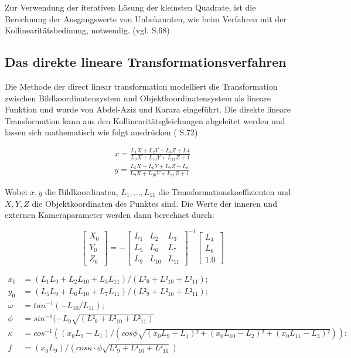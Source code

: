Zur Verwendung der iterativen Lösung der kleinsten Quadrate, ist die Berechnung der Ausgangswerte von Unbekannten, wie beim Verfahren mit der Kollinearitätsbedinung, notwendig. (vgl. \cite{comparative_conditions_study} S.68)


\subsection{Das direkte lineare Transformationsverfahren}

Die Methode der \glqq direct linear transformation\grqq{}  modelliert die Transformation zwischen Bildkoordinatensystem und Objektkoordinatensystem als lineare Funktion und wurde von Abdel-Aziz und Karara \cite{dlt_intro} eingeführt. Die direkte lineare Transformation kann aus den Kollinearitätsgleichungen abgeleitet werden und lassen sich mathematisch wie folgt ausdrücken (\cite{dlt} S.72)

\begin{equation}
\begin{aligned}
x=\frac{L_1X+L_2Y+L_3Z+L4}{L_9X+L_{10}Y+L_{11}Z+1} \\
y=\frac{L_5X+L_6Y+L_7Z+L_8}{L_9X+L_{10}Y+L_{11}Z+1}
\end{aligned}
\end{equation}

Wobei $x,y$ die Bildkoordinaten, $L_1,...,L_{11}$ die Transformationskoeffizienten und $X,Y,Z$ die Objektkoordinaten des Punktes sind. Die Werte der inneren und externen Kameraparameter werden dann berechnet durch:

\begin{equation}
\begin{bmatrix}
X_0 \\ Y_0 \\ Z_0 
\end{bmatrix}
 = -
 \begin{bmatrix}
 L_1 & L_2 & L_3 \\
 L_5 & L_6 & L_7 \\
 L_9 & L_{10} & L_{11}
 \end{bmatrix}^{-1}
 \begin{bmatrix}
 L_4 \\ L_8 \\ 1.0
 \end{bmatrix}
 \end{equation}
 
 \begin{equation}
 \begin{aligned}
 x_0 &= (L_1L_9 + L_2L_{10} + L_3L_{11})/(L²_9 + L²_{10} + L²_{11}); \\
 y_0 &= (L_5L_9 + L_6L_{10} + L_7L_{11})/(L²_9 + L²_{10} + L²_{11}); \\
 \omega &= tan^{-1}(-L_{10}/L_{11}); \\
 \phi &= sin^{-1}(-L_9 \sqrt{(L²_9 + L²_{10} + L²_{11})} \\
  \kappa &= cos^{-1}((x_0L_9 - L_1)/(cos \phi \sqrt{(x_0L_9-L_1)² + (x_0L_{10}-L_2)² + (x_0L_{11}-L_3)²})); \\
 f&=(x_0L_9)/(cos \kappa \cdot \phi \sqrt{L²_9 + L²_{10} + L²_{11}}) 
 \end{aligned}
 \end{equation}

